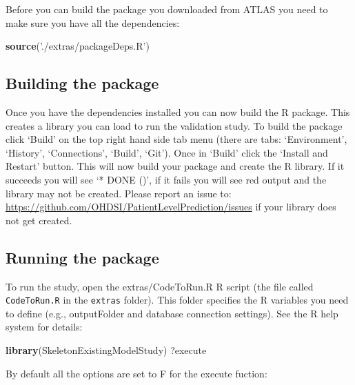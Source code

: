 \documentclass[
]{article}
\newenvironment{Shaded}{\begin{snugshade}}{\end{snugshade}}
\newcommand{\KeywordTok}[1]{\textcolor[rgb]{0.13,0.29,0.53}{\textbf{#1}}}
\newcommand{\NormalTok}[1]{#1}
\newcommand{\StringTok}[1]{\textcolor[rgb]{0.31,0.60,0.02}{#1}}
\begin{document}
Before you can build the package you downloaded from ATLAS you need to
make sure you have all the dependencies:

\begin{Shaded}
\begin{Highlighting}[]
\KeywordTok{source}\NormalTok{(}\StringTok{'./extras/packageDeps.R'}\NormalTok{)}
\end{Highlighting}
\end{Shaded}

\hypertarget{building-the-package}{%
\subsection{Building the package}\label{building-the-package}}

Once you have the dependencies installed you can now build the R
package. This creates a library you can load to run the validation
study. To build the package click `Build' on the top right hand side tab
menu (there are tabs: `Environment', `History', `Connections', `Build',
`Git'). Once in `Build' click the `Install and Restart' button. This
will now build your package and create the R library. If it succeeds you
will see `* DONE ()', if it fails you will see red output and the
library may not be created. Please report an issue to:
\url{https://github.com/OHDSI/PatientLevelPrediction/issues} if your
library does not get created.

\hypertarget{running-the-package}{%
\subsection{Running the package}\label{running-the-package}}

To run the study, open the extras/CodeToRun.R R script (the file called
\texttt{CodeToRun.R} in the \texttt{extras} folder). This folder
specifies the R variables you need to define (e.g., outputFolder and
database connection settings). See the R help system for details:

\begin{Shaded}
\begin{Highlighting}[]
\KeywordTok{library}\NormalTok{(SkeletonExistingModelStudy)}
\NormalTok{?execute}
\end{Highlighting}
\end{Shaded}

By default all the options are set to F for the execute fuction:
\end{document}
